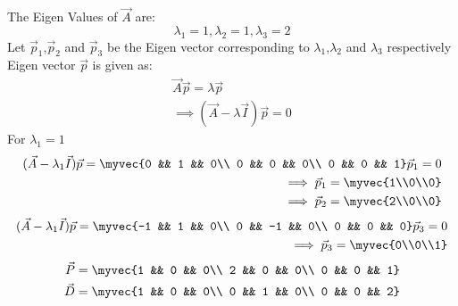 \documentclass[journal,12pt,twocolumn]{IEEEtran}
\begin{document}
The Eigen Values of $\vec{A}$ are:
\begin{equation} \label{3.0.10}
\lambda_1 = 1, \lambda_2 = 1, \lambda_3 = 2
\end{equation}
Let $\vec{p}_1$,$\vec{p}_2$ and $\vec{p}_3$ be the Eigen vector corresponding to $\lambda_1$,$\lambda_2$ and $\lambda_3$ respectively\\
Eigen vector $\vec{p}$ is given as:
\begin{equation} \label{3.0.11}
\begin{split}
\vec{A}\vec{p} = \lambda\vec{p}\\
\implies (\vec{A} - \lambda \vec{I})\vec{p} = 0
\end{split}
\end{equation}
For $\lambda_1 = 1$
\begin{equation}\label{3.0.12}
\begin{split}
(\vec{A} - \lambda_1 \vec{I})\vec{p} = \myvec{0 && 1 && 0\\ 0 && 0 && 0\\ 0 && 0 && 1}\vec{p}_1 = 0\\ 
\implies \vec{p}_1 = \myvec{1\\0\\0}\\
\implies \vec{p}_2 = \myvec{2\\0\\0}
\end{split}
\end{equation}
\begin{equation}\label{3.0.13}
\begin{split}
(\vec{A} - \lambda_1 \vec{I})\vec{p} = \myvec{-1 && 1 && 0\\ 0 && -1 && 0\\ 0 && 0 && 0}\vec{p}_3 = 0\\ 
\implies \vec{p}_3 = \myvec{0\\0\\1}
\end{split}
\end{equation}
\begin{equation}\label{3.0.14}
\begin{split}
\vec{P} = \myvec{1 && 0 && 0\\ 2 && 0 && 0\\ 0 && 0 && 1}\\
\vec{D} = \myvec{1 && 0 && 0\\ 0 && 1 && 0\\ 0 && 0 && 2}
\end{split}
\end{equation}
\end{document}

